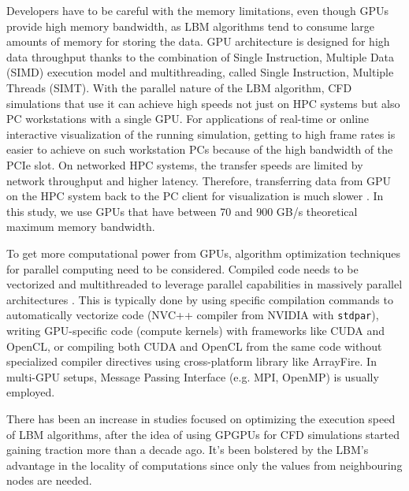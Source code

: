 Developers have to be careful with the memory limitations, even though GPUs provide high memory bandwidth, as LBM algorithms tend to consume large amounts of memory for storing the data. GPU architecture is designed for high data throughput thanks to the combination of Single Instruction, Multiple Data (SIMD) execution model and multithreading, called Single Instruction, Multiple Threads (SIMT). With the parallel nature of the LBM algorithm, CFD simulations that use it can achieve high speeds not just on HPC systems but also PC workstations with a single GPU. For applications of real-time or online interactive visualization of the running simulation, getting to high frame rates is easier to achieve on such workstation PCs because of the high bandwidth of the PCIe slot. On networked HPC systems, the transfer speeds are limited by network throughput and higher latency. Therefore, transferring data from GPU on the HPC system back to the PC client for visualization is much slower \citep{linxweilerHighlyInteractiveComputational2010}. In this study, we use GPUs that have between 70 and 900 GB/s theoretical maximum memory bandwidth.

To get more computational power from GPUs, algorithm optimization techniques for parallel computing need to be considered. Compiled code needs to be vectorized and multithreaded to leverage parallel capabilities in massively parallel architectures \citep{delboscOptimizedImplementationLattice2014}. This is typically done by using specific compilation commands to automatically vectorize code (NVC++ compiler from NVIDIA with \texttt{stdpar}), writing GPU-specific code (compute kernels) with frameworks like CUDA and OpenCL, or compiling both CUDA and OpenCL from the same code without specialized compiler directives using cross-platform library like ArrayFire. In multi-GPU setups, Message Passing Interface (e.g. MPI, OpenMP) is usually employed.

There has been an increase in studies focused on optimizing the execution speed of LBM algorithms, after the idea of using GPGPUs for CFD simulations started gaining traction more than a decade ago. It's been bolstered by the LBM's advantage in the locality of computations since only the values from neighbouring nodes are needed. 

